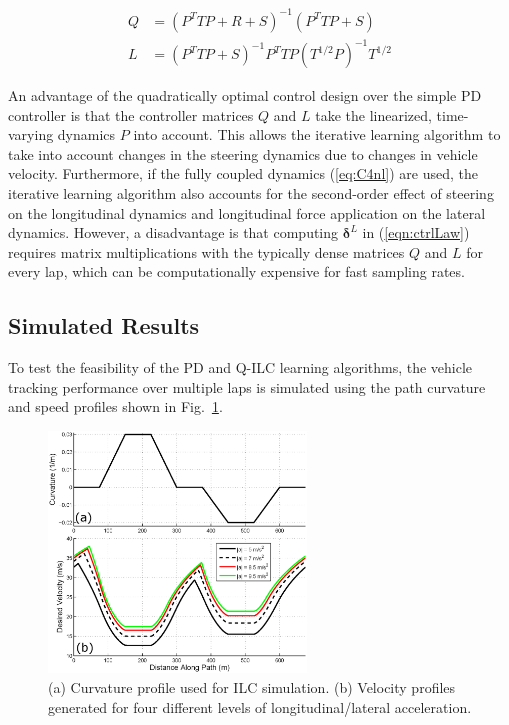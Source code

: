 \documentclass[9pt,shortpaper,twoside,web]{ieeecolor}
\begin{document}
\begin{subequations}
\label{eq:analSol}
\begin{align}
	Q &= (P^TTP + R + S)^{-1}(P^TTP + S)\\
	L &= (P^TTP + S)^{-1}P^TTP(T^{1/2}P)^{-1}T^{1/2}
\end{align}
\end{subequations}

An advantage of the quadratically optimal control design over the simple PD controller is that the controller matrices $Q$ and $L$ take the linearized, time-varying dynamics $P$ into account. 
This allows the iterative learning algorithm
to take into account changes in the steering dynamics due to changes in vehicle velocity.
Furthermore, if the fully coupled dynamics (\ref{eq:C4nl}) are used, the iterative learning algorithm also accounts for the
second-order effect of steering on the longitudinal dynamics and longitudinal force application on the lateral dynamics. 
 However, a disadvantage is that computing $\mathbf{\delta}^L$ in (\ref{eqn:ctrlLaw}) requires matrix multiplications with
the typically dense matrices $Q$ and $L$ for every lap, which can be computationally expensive for fast sampling rates. 

\subsection{Simulated Results}
\label{sec:simres}

To test the feasibility of the PD and Q-ILC learning algorithms, the vehicle tracking performance over multiple laps is
simulated using the path curvature and speed profiles shown in Fig.~\ref{fig:simSetup}.
\begin{figure}[bh]
\centering
\includegraphics[width= 2.7in]{figures/simSetup.eps}
\caption[Curvature profile used for ILC simulation.]{ (a) Curvature profile used for ILC simulation. (b) Velocity profiles generated for four different levels of longitudinal/lateral acceleration. }
\label{fig:simSetup}
\end{figure}
\end{document}
